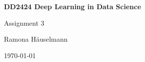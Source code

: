 \begin{titlepage}
\begin{center}
	\vspace{3em}	
    {\Huge\bfseries DD2424 Deep Learning in Data Science\par}
    \vspace{2em}
    {\huge Assignment 3 \par}
    \vspace{3em}
    {\Large Ramona Häuselmann\par}
	\vspace{1em}
    \today
\end{center}
\end{titlepage}